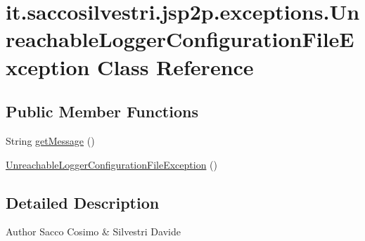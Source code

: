 \hypertarget{classit_1_1saccosilvestri_1_1jsp2p_1_1exceptions_1_1_unreachable_logger_configuration_file_exception}{
\section{it.saccosilvestri.jsp2p.exceptions.\-Unreachable\-Logger\-Configuration\-File\-Exception \-Class \-Reference}
\label{classit_1_1saccosilvestri_1_1jsp2p_1_1exceptions_1_1_unreachable_logger_configuration_file_exception}
}
\subsection*{\-Public \-Member \-Functions}
\begin{DoxyCompactItemize}
\item 
\-String \hyperlink{classit_1_1saccosilvestri_1_1jsp2p_1_1exceptions_1_1_unreachable_logger_configuration_file_exception_abacb8f73b8b658ca2f5203dda2041967}{get\-Message} ()
\item 
\hyperlink{classit_1_1saccosilvestri_1_1jsp2p_1_1exceptions_1_1_unreachable_logger_configuration_file_exception_a7a27ce30d87f6f3870808b4b8c38bc0c}{\-Unreachable\-Logger\-Configuration\-File\-Exception} ()
\end{DoxyCompactItemize}


\subsection{\-Detailed \-Description}
\begin{DoxyAuthor}{\-Author}
\-Sacco \-Cosimo \& \-Silvestri \-Davide 
\end{DoxyAuthor}


